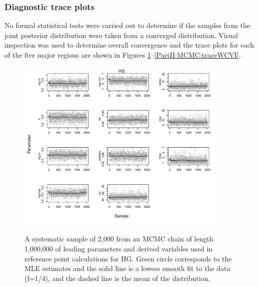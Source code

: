 \subsubsection{Diagnostic trace plots}

No formal  statistical tests were carried out to determine if the samples from the joint posterior distribution were taken from a converged distribution.  Visual inspection was used to determine overall convergence and the trace plots for each of the five major regions are shown in Figures \ref{PartII:MCMC:traceHG}--\ref{PartII:MCMC:traceWCVI}.

\begin{figure}
	\centering
	\includegraphics[width=0.9\textwidth]{../FIGS/qPriorFigs/iscam_fig_trace_HG.pdf}\\
	\caption{A systematic sample of 2,000 from an MCMC chain of length 1,000,000 of leading parameters and derived variables used in reference point calculations for HG. Green circle corresponds to the MLE estimates and the solid line is a lowess smooth fit to the data (f=1/4), and the dashed line is the mean of the distribution.}\label{PartII:MCMC:traceHG}
\end{figure}


